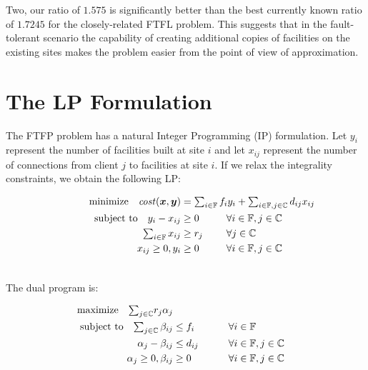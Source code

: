 \documentclass[11pt]{article}
\begin{document}
Two, our ratio of $1.575$ is significantly better than the
best currently known ratio of $1.7245$ for the
closely-related FTFL problem. This suggests that in the
fault-tolerant scenario the capability of creating
additional copies of facilities on the existing sites makes
the problem easier from the point of view of approximation.


\section{The LP Formulation}\label{sec: the lp formulation}

The FTFP problem has a natural Integer Programming (IP)
formulation. Let $y_i$ represent the number of facilities
built at site $i$ and let $x_{ij}$ represent the number of
connections from client $j$ to facilities at site $i$. If we
relax the integrality constraints, we obtain the following LP:

\begin{alignat}{3}
  \textrm{minimize} \quad \cost(\bfx,\bfy) &= \textstyle{\sum_{i\in \sitesset}f_iy_i 
								+ \sum_{i\in \sitesset, j\in \clientset}d_{ij}x_{ij}}\label{eqn:fac_primal}\hspace{-1.5in}&&
									\\ \notag
  \textrm{subject to}\quad y_i - x_{ij} &\geq 0 			&\quad 		&\forall i\in \sitesset, j\in \clientset 
									\\ \notag
     \textstyle{\sum_{i\in \sitesset} x_{ij}} &\geq r_j  &			&\forall j\in \clientset
 									\\ \notag
  	  x_{ij} \geq 0, y_i &\geq 0 						& 			&\forall i\in \sitesset, j\in \clientset 
  									\\ \notag
\end{alignat}


\noindent
The dual program is:

\begin{alignat}{3}
  \textrm{maximize}\quad \textstyle{\sum_{j\in \mathbb{C}}} r_j\alpha_j&\label{eqn:fac_dual}  
     						\\ \notag
  \textrm{subject to} \quad \textstyle{
    \sum_{j\in \mathbb{C}}\beta_{ij}} &\leq f_i  &\quad\quad			&\forall i \in \mathbb{F}  
							\\ \notag
  \alpha_{j} - \beta_{ij} 	&\leq  d_{ij}       &                 & \forall i\in \mathbb{F}, j\in \mathbb{C} 
							\\ \notag
  \alpha_j \geq 0, \beta_{ij} &\geq 0           &            & \forall i\in \mathbb{F}, j\in \mathbb{C}
  							\\ \notag
\end{alignat}
\end{document}
